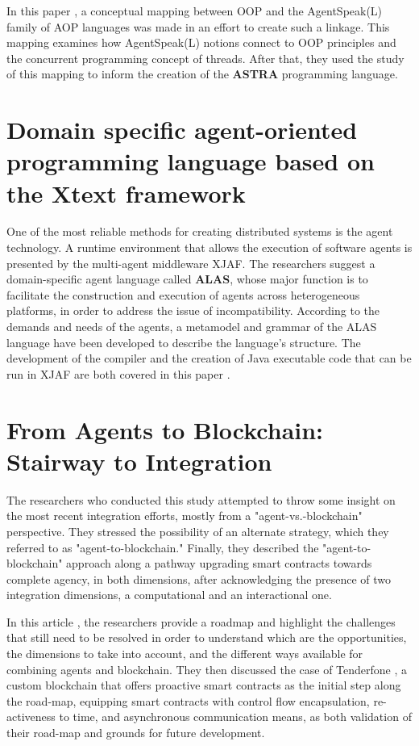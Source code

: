 In this paper \cite{astra}, a conceptual mapping between \ac{OOP} and the AgentSpeak(L) family of \ac{AOP} languages was made in an effort to create such a linkage. This mapping examines how AgentSpeak(L) notions connect to \ac{OOP} principles and the concurrent programming concept of threads. After that, they used the study of this mapping to inform the creation of the \textbf{\ac{ASTRA}} programming language.

\section{Domain specific agent-oriented programming language based on the Xtext framework}

One of the most reliable methods for creating distributed systems is the agent technology. A runtime environment that allows the execution of software agents is presented by the multi-agent middleware XJAF. The researchers suggest a domain-specific agent language called \textbf{ALAS}, whose major function is to facilitate the construction and execution of agents across heterogeneous platforms, in order to address the issue of incompatibility. According to the demands and needs of the agents, a metamodel and grammar of the ALAS language have been developed to describe the language's structure. The development of the compiler and the creation of Java executable code that can be run in XJAF are both covered in this paper \cite{xtext}.

\section{From Agents to Blockchain: Stairway to Integration}

The researchers who conducted this study attempted to throw some insight on the most recent integration efforts, mostly from a "agent-vs.-blockchain" perspective. They stressed the possibility of an alternate strategy, which they referred to as "agent-to-blockchain." Finally, they described the "agent-to-blockchain" approach along a pathway upgrading smart contracts towards complete agency, in both dimensions, after acknowledging the presence of two integration dimensions, a computational and an interactional one.

\vspace{.5cm}

In this article \cite{ag2bc}, the researchers provide a roadmap and highlight the challenges that still need to be resolved in order to understand which are the opportunities, the dimensions to take into account, and the different ways available for combining agents and blockchain. They then discussed the case of Tenderfone \cite{tenGlab}, a custom blockchain that offers proactive smart contracts as the initial step along the road-map, equipping smart contracts with control flow encapsulation, re-activeness to time, and asynchronous communication means, as both validation of their road-map and grounds for future development.


